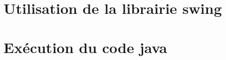 \documentclass[letter,french]{report}
\begin{document}
\section*{Utilisation de la librairie swing}



\section*{Exécution du code java}
\end{document}
